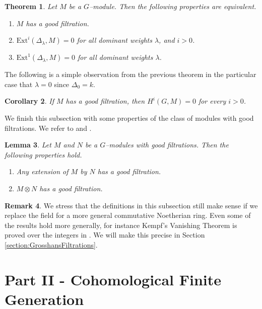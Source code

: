 \documentclass{article}
\theoremstyle{plain}
\newtheorem{Th}{Theorem}[section]
\newtheorem{Lemma}[Th]{Lemma}
\newtheorem{Cor}[Th]{Corollary}
\theoremstyle{definition}
\newtheorem{Rem}[Th]{Remark}
\begin{document}
 

\begin{Th}\label{modules with a good filtration are acyclic}
   Let $M$ be a $G$--module. Then the following properties are equivalent.
   \begin{enumerate}
       \item $M $ has a good filtration. 
       \item $\mathrm{Ext}^i(\Delta_\lambda, M)=0$ for all dominant weights $\lambda$, and $i>0$.
       \item $\mathrm{Ext}^1(\Delta_\lambda, M)=0$ for all dominant weights $\lambda$.
   \end{enumerate}
\end{Th}

The following is a simple observation from the previous theorem in the particular case that $\lambda=0$ since $\Delta_0=k$.

\begin{Cor}
    If $M$ has a good filtration,  then  $H^i(G,M)=0$ for every $i>0$.
\end{Cor}

We finish this subsection with some properties of the class of modules with good filtrations. We refer to \cite[Chapter 3]{Don85} and \cite{Mathieu3}. 


\begin{Lemma}\label{properties of good filtrations}
     Let $M$ and $N$ be a $G$--modules with good filtrations. Then the following properties hold. 
     \begin{enumerate}
         \item Any extension of $M$ by $N$ has a good filtration.
         \item $M\otimes N$ has a good filtration.
     \end{enumerate} 
\end{Lemma}




\begin{Rem}
We stress that the definitions in this subsection still make sense if we replace the field for a more general commutative Noetherian ring. Even some of the results hold more generally, for instance Kempf's Vanishing Theorem  is proved over the integers in \cite[Section B.4]{jantzen2003representations}. We will make this precise in Section \ref{section:GrosshansFiltrations}.
\end{Rem}
\pagebreak


\part*{Part II - Cohomological Finite Generation}\label{part II}
\end{document}
